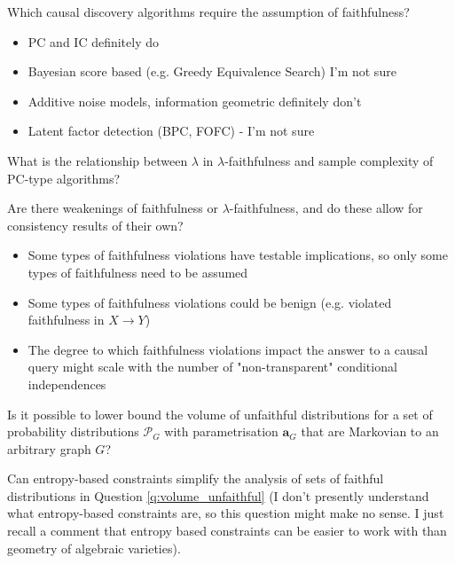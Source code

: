 \begin{question}
    Which causal discovery algorithms require the assumption of faithfulness?
    \begin{itemize}
        \item PC and IC definitely do
        \item Bayesian score based (e.g. Greedy Equivalence Search) I'm not sure
        \item Additive noise models, information geometric definitely don't
        \item Latent factor detection (BPC, FOFC) - I'm not sure \cite{kummerfeld_causal_2016}
    \end{itemize}
\end{question}

\begin{question}
    What is the relationship between $\lambda$ in $\lambda$-faithfulness and sample complexity of PC-type algorithms?
\end{question}

\begin{question}
    Are there weakenings of faithfulness or $\lambda$-faithfulness, and do these allow for consistency results of their own?
    \begin{itemize}
        \item Some types of faithfulness violations have testable implications, so only some types of faithfulness need to be assumed \cite{ramsey_adjacency-faithfulness_2012}
        \item Some types of faithfulness violations could be benign (e.g. violated faithfulness in $X\to Y$) \cite{peters_structural_2013}
        \item The degree to which faithfulness violations impact the answer to a causal query might scale with the number of "non-transparent" conditional independences 
    \end{itemize}
\end{question}

\begin{question}\label{q:volume_unfaithful}
    Is it possible to lower bound the volume of unfaithful distributions for a set of probability distributions $\mathcal{P}_G$ with parametrisation $\mathbf{a}_G$ that are Markovian to an arbitrary graph $G$? \cite{uhler_geometry_2013}
\end{question}

\begin{question}
    Can entropy-based constraints simplify the analysis of sets of faithful distributions in Question \ref{q:volume_unfaithful} (I don't presently understand what entropy-based constraints are, so this question might make no sense. I just recall a comment that entropy based constraints can be easier to work with than geometry of algebraic varieties).
\end{question}

